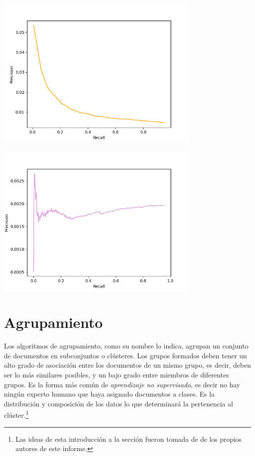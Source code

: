 \documentclass{llncs}
\begin{document}
	\begin{center}
		\includegraphics[width=10cm]{cranfield_fuzzy}
		
		\includegraphics[width=10cm]{vaswani_fuzzy}
	\end{center}	
	
    \section{Agrupamiento}
	
	Los algoritmos de agrupamiento, como su nombre lo indica, agrupan un conjunto de documentos en subconjuntos o clústeres. Los grupos formados deben tener un alto grado de asociación entre los documentos de un mismo grupo, es decir, deben ser lo m\'as similares posibles, y un bajo grado entre miembros de diferentes grupos. Es la forma más común de \textit{aprendizaje no supervisado}, es decir no hay ningún experto humano que haya asignado documentos a clases. Es la distribución y composición de los datos lo que determinará la pertenencia al clúster.\footnote{Las ideas de esta introducci\'on a la secci\'on fueron tomada de \cite{B6} de los propios autores de este informe.}
	
\end{document}
